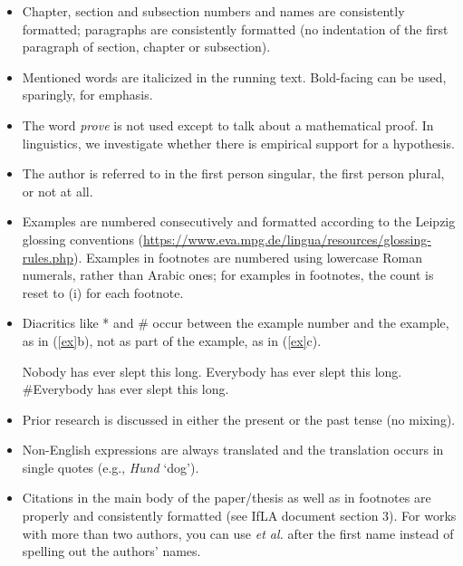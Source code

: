 \documentclass[11pt,fleqn,a4paper/thesis]{article}
\def\infelic{{\leavevmode\llap{\#}}}
\newcommand{\6}{\mbox{$[\hspace*{-.6mm}[$}}
\newcommand{\9}{\mbox{$]\hspace*{-.6mm}]$}}
\begin{document}
\begin{itemize}[itemsep=-1pt,leftmargin=2.5ex,topsep=-2pt]
\item Chapter, section and subsection numbers and names are consistently formatted; paragraphs are consistently formatted (no indentation of the first paragraph of section, chapter or subsection).

\item Mentioned words are italicized in the running text. Bold-facing can be used, sparingly, for emphasis.

\item The word {\em prove} is not used except to talk about a mathematical proof. In linguistics, we investigate whether there is empirical support for a hypothesis. 

\item The author is referred to in the first person singular, the first person plural, or not at all.

\item Examples are numbered consecutively and formatted according to the Leipzig glossing conventions (\url{https://www.eva.mpg.de/lingua/resources/glossing-rules.php}). Examples in footnotes are numbered using lowercase Roman numerals, rather than Arabic ones; for examples in footnotes, the count is reset to (i) for each footnote.

\item Diacritics like * and \# occur between the example number and the example, as in (\ref{ex}b), not as part of the example, as in (\ref{ex}c).

\begin{exe}
\ex\label{ex}
\begin{xlist}
\ex Nobody has ever slept this long.
\ex \infelic Everybody has ever slept this long.
\ex \#Everybody has ever slept this long.
\end{xlist}
\end{exe}

\item Prior research is discussed in either the present or the past tense (no mixing).

\item Non-English expressions are always translated and the translation occurs in single quotes (e.g., {\em Hund} `dog').

\item Citations in the main body of the paper/thesis as well as in footnotes are properly and consistently formatted (see IfLA document section 3). For works with more than two authors, you can use {\em et al.} after the first name instead of spelling out the authors' names. 


\end{itemize}
\end{document}
